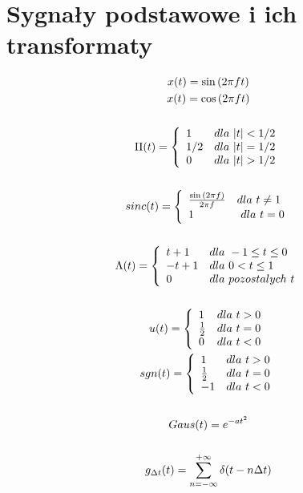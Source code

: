 \newpage
\section{Sygnały podstawowe i ich transformaty}
    \begin{multicols}{2}
        \noindent
        \begin{gather*}
            x(t) = \sin{(2\pi ft)}\\
            x(t) = \cos{(2\pi ft)}\\
\\%
            \Pi(t) = \left\{\begin{array}{l l}
                1 & dla\ |t| < 1/2\\
                1/2 & dla\ |t| = 1/2\\
                0 & dla\ |t| > 1/2
            \end{array} \right.\\
\\%
            sinc(t) = \left\{\begin{array}{l l}
                \frac{\sin{(2\pi f)}}{2\pi f} & dla\ t \neq 1\\
                1 &\ dla\ t = 0
            \end{array}\right.\\
\\%
            \Lambda(t) = \left\{\begin{array}{l l}
                t+1 & dla\ -1 \leq t \leq 0\\
                -t+1 & dla\ 0 < t \leq 1\\
                0 & dla\ pozostalych\ t
            \end{array}\right.\\
\\%
            u(t) = \left\{\begin{array}{l l}
                1 & dla\ t>0\\
                \frac{1}{2} & dla\ t=0\\
                0 & dla\ t <0
            \end{array}\right.
\\%
            sgn(t) = \left\{\begin{array}{l l}
                1 & dla\ t>0\\
                \frac{1}{2} & dla\ t=0\\
                -1 & dla\ t <0
            \end{array}\right.
\\\\%
            Gaus(t) = e^{-at^2}
\\\\%
            g_{\Delta t}(t) = \sum_{n=-\infty}^{+\infty} \delta(t-n\Delta t)
        \end{gather*}


\end{multicols}
